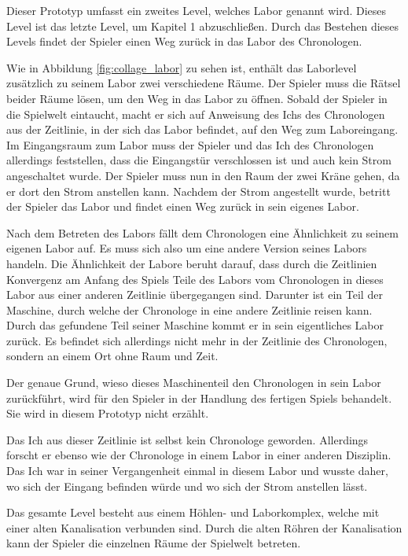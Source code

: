 Dieser Prototyp umfasst ein zweites Level, welches Labor genannt wird. Dieses Level ist das letzte Level, um Kapitel 1 abzuschließen. Durch das Bestehen dieses Levels findet der Spieler einen Weg zurück in das Labor des Chronologen.

Wie in Abbildung \ref{fig:collage_labor}  zu sehen ist, enthält das Laborlevel zusätzlich zu seinem Labor zwei verschiedene Räume. Der Spieler muss die Rätsel beider Räume lösen, um den Weg in das Labor zu öffnen. Sobald der Spieler in die Spielwelt eintaucht, macht er sich auf Anweisung des Ichs des Chronologen aus der Zeitlinie, in der sich das Labor befindet, auf den Weg zum Laboreingang. Im Eingangsraum zum Labor muss der Spieler und das Ich des Chronologen allerdings feststellen, dass die Eingangstür verschlossen ist und auch kein Strom angeschaltet wurde. Der Spieler muss nun in den Raum der zwei Kräne gehen, da er dort den Strom anstellen kann. Nachdem der Strom angestellt wurde, betritt der Spieler das Labor und findet einen Weg zurück in sein eigenes Labor.

Nach dem Betreten des Labors fällt dem Chronologen eine Ähnlichkeit zu seinem eigenen Labor auf. Es muss sich also um eine andere Version seines Labors handeln. Die Ähnlichkeit der Labore beruht darauf, dass durch die Zeitlinien Konvergenz am Anfang des Spiels Teile des Labors vom Chronologen in dieses Labor aus einer anderen Zeitlinie übergegangen sind. Darunter ist ein Teil der Maschine, durch welche der Chronologe in eine andere Zeitlinie reisen kann. Durch das gefundene Teil seiner Maschine kommt er in  sein eigentliches Labor zurück. Es befindet sich allerdings nicht mehr in der Zeitlinie des Chronologen, sondern an einem Ort ohne Raum und Zeit.

Der genaue Grund, wieso dieses Maschinenteil den Chronologen in sein Labor zurückführt, wird für den Spieler in der Handlung des fertigen Spiels behandelt. Sie wird in diesem Prototyp nicht erzählt.

Das Ich aus dieser Zeitlinie ist selbst kein Chronologe geworden. Allerdings forscht er ebenso wie der Chronologe in einem Labor in einer anderen Disziplin. Das Ich war in seiner Vergangenheit einmal in diesem Labor und wusste daher, wo sich der Eingang befinden würde und wo sich der Strom anstellen lässt.

Das gesamte Level besteht aus einem Höhlen- und Laborkomplex, welche mit einer alten Kanalisation verbunden sind. Durch die alten Röhren der Kanalisation kann der Spieler die einzelnen Räume der Spielwelt betreten.

